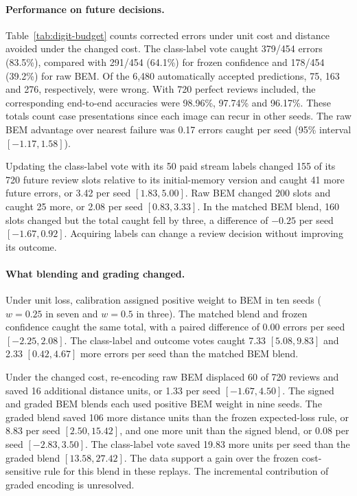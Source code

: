 \paragraph{Performance on future decisions.}
Table~\ref{tab:digit-budget} counts corrected errors under unit cost and
distance avoided under the changed cost. The class-label vote caught
379/454 errors (83.5\%), compared with 291/454 (64.1\%) for frozen confidence
and 178/454 (39.2\%) for raw BEM. Of the 6,480 automatically accepted
predictions, 75, 163 and 276, respectively, were wrong. With 720 perfect
reviews included, the corresponding end-to-end accuracies were 98.96\%,
97.74\% and 96.17\%. These totals count case presentations since each image
can recur in other seeds. The raw BEM advantage over nearest failure was
0.17 errors caught per seed (95\% interval $[-1.17,1.58]$).

Updating the class-label vote with its 50 paid stream labels changed 155 of
its 720 future review slots relative to its initial-memory version and
caught 41 more future errors, or 3.42 per seed $[1.83,5.00]$.
Raw BEM changed 200 slots and caught 25 more, or 2.08 per seed
$[0.83,3.33]$. In the matched BEM blend, 160 slots changed but the total
caught fell by three, a difference of $-0.25$ per seed $[-1.67,0.92]$.
Acquiring labels can change a review decision without improving its outcome.

\paragraph{What blending and grading changed.}
Under unit loss, calibration assigned positive weight to BEM in ten seeds
($w=0.25$ in seven and $w=0.5$ in three). The matched blend and frozen
confidence caught the same total, with a paired difference of 0.00 errors
per seed $[-2.25,2.08]$. The class-label and outcome votes caught 7.33
$[5.08,9.83]$ and 2.33 $[0.42,4.67]$ more errors per seed than the matched
BEM blend.

Under the changed cost, re-encoding raw BEM displaced 60 of 720 reviews
and saved 16 additional distance units, or 1.33 per seed $[-1.67,4.50]$.
The signed and graded BEM blends each used positive BEM weight in nine
seeds. The graded blend saved 106 more distance units than the frozen
expected-loss rule, or 8.83 per seed $[2.50,15.42]$, and one more unit
than the signed blend, or 0.08 per seed $[-2.83,3.50]$. The class-label
vote saved 19.83 more units per seed than the graded blend $[13.58,27.42]$.
The data support a gain over the frozen cost-sensitive rule for this blend
in these replays. The incremental contribution of graded encoding is
unresolved.


